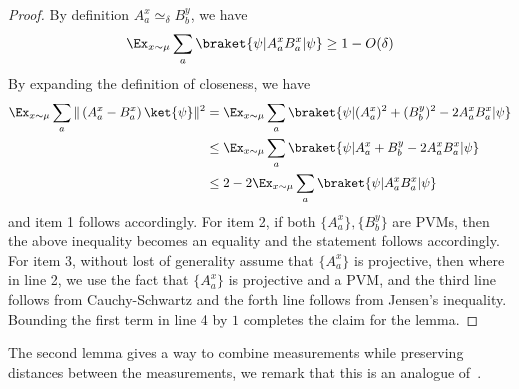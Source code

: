 \begin{proof}
	By definition $A_a^x \simeq_{\delta} B^y_b$, we have 
	\begin{equation*}
		\Ex_{x \sim \mu} \sum_{a} \braket{\psi|A_a^x B_a^x|\psi} \geq 1-  O(\delta)
	\end{equation*}
	By expanding the definition of closeness, we have 
	\begin{align*}
		\Ex_{x \sim \mu} \sum_{a}\| \left(A_a^x -  B_a^x\right) \ket{\psi}\|^2 &= 	\Ex_{x \sim \mu} \sum_{a}  \braket{\psi|(A_a^x)^2 +(B_b^y)^2 - 2 A_a^x B_a^x  |\psi} \\
		&\leq \Ex_{x \sim \mu} \sum_{a}  \braket{\psi|A_a^x +B_b^y - 2 A_a^x B_a^x  |\psi} \\
		&\leq 2 - 2	\Ex_{x \sim \mu} \sum_{a} \braket{\psi|A_a^x B_a^x|\psi}
	\end{align*}
	and item 1 follows accordingly. For item 2, if both $\{ A_{a}^x \}, \{ B_{b}^y \}$ are PVMs, then the above inequality becomes an equality and the statement follows accordingly. For item 3, without lost of generality assume that $\{ A_{a}^x \}$ is projective, then 
	where in line 2, we use the fact that $\{ A_{a}^x \}$ is projective and a PVM, and the third line follows from Cauchy-Schwartz and the forth line follows from Jensen's inequality. Bounding the first term in line 4 by $1$ completes the claim for the lemma. 
\end{proof}
The second lemma gives a way to combine measurements while preserving distances between the measurements, we remark that this is an analogue of~\cite[Fact 4.20]{natarajanNEEXPMIP2019a}. 
